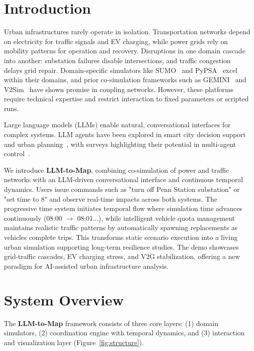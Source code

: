 \documentclass[sigconf,review,nonacm]{acmart}
\begin{document}
\section{Introduction}
Urban infrastructures rarely operate in isolation. Transportation networks depend on electricity for traffic signals and EV charging, while power grids rely on mobility patterns for operation and recovery. Disruptions in one domain cascade into another: substation failures disable intersections, and traffic congestion delays grid repair. Domain-specific simulators like SUMO~\cite{lopez2018sumo} and PyPSA~\cite{brown2018pypsa} excel within their domains, and prior co-simulation frameworks such as GEMINI~\cite{panossian2023architecture} and V2Sim~\cite{qian2024v2sim} have shown promise in coupling networks. However, these platforms require technical expertise and restrict interaction to fixed parameters or scripted runs.

Large language models (LLMs) enable natural, conversational interfaces for complex systems. LLM agents have been explored in smart city decision support~\cite{kalyuzhnaya2025llm} and urban planning~\cite{han2025large}, with surveys highlighting their potential in multi-agent control~\cite{guo2024large}.

We introduce \textbf{LLM-to-Map}, combining co-simulation of power and traffic networks with an LLM-driven conversational interface and continuous temporal dynamics. Users issue commands such as "turn off Penn Station substation" or "set time to 8" and observe real-time impacts across both systems. The progressive time system initiates temporal flow where simulation time advances continuously (08:00 $\rightarrow$ 08:01...), while intelligent vehicle quota management maintains realistic traffic patterns by automatically spawning replacements as vehicles complete trips. This transforms static scenario execution into a living urban simulation supporting long-term resilience studies. The demo showcases grid-traffic cascades, EV charging stress, and V2G stabilization, offering a new paradigm for AI-assisted urban infrastructure analysis.

\section{System Overview}
The \textbf{LLM-to-Map} framework consists of three core layers: (1) domain simulators, (2) coordination engine with temporal dynamics, and (3) interaction and visualization layer (Figure~\ref{fig:structure}).
\end{document}
